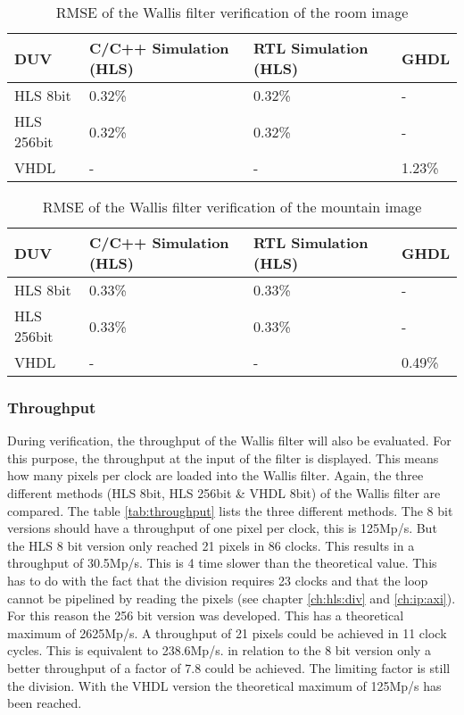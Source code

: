 \begin{table}[tb!]
    \centering
    \begin{tabular}{l l l l}
        \toprule
        DUV & C/C++ Simulation (HLS) & RTL Simulation (HLS) & GHDL \\
        \midrule
        HLS 8bit    & 0.32\%    & 0.32\%    & -\\
        HLS 256bit  & 0.32\%    & 0.32\%    & - \\
        VHDL        & -         & -         & 1.23\% \\
        \bottomrule
    \end{tabular}
    \caption{RMSE of the Wallis filter verification of the room image}
    \label{tab:rmse_room}
\end{table}

\begin{table}[tb!]
    \centering
    \begin{tabular}{l l l l}
        \toprule
        DUV & C/C++ Simulation (HLS) & RTL Simulation (HLS) & GHDL \\
        \midrule
        HLS 8bit    & 0.33\%    & 0.33\%    & - \\
        HLS 256bit  & 0.33\%    & 0.33\%    & - \\
        VHDL        & -         & -         & 0.49\% \\
        \bottomrule
    \end{tabular}
    \caption{RMSE of the Wallis filter verification of the mountain image}
    \label{tab:rmse_mountain}
\end{table}



\subsubsection*{Throughput}
During verification, the throughput of the Wallis filter will also be evaluated. For this purpose, the throughput at the input of the filter is displayed. This means how many pixels per clock are loaded into the Wallis filter. Again, the three different methods (HLS 8bit, HLS 256bit \& VHDL 8bit) of the Wallis filter are compared. The table \ref{tab:throughput} lists the three different methods. The 8 bit versions should have a throughput of one pixel per clock, this is 125Mp/s. But the HLS 8 bit version only reached 21 pixels in 86 clocks. This results in a throughput of 30.5Mp/s. This is 4 time slower than the theoretical value. This has to do with the fact that the division requires 23 clocks and that the loop cannot be pipelined by reading the pixels (see chapter \ref{ch:hls:div} and \ref{ch:ip:axi}). For this reason the 256 bit version was developed. This has a theoretical maximum of 2625Mp/s. A throughput of 21 pixels could be achieved in 11 clock cycles. This is equivalent to 238.6Mp/s. in relation to the 8 bit version only a better throughput of a factor of 7.8 could be achieved. The limiting factor is still the division. With the VHDL version the theoretical maximum of 125Mp/s has been reached.

